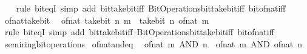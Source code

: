 \begin{isabellebody}
%
\isadelimproof
\ \ %
\endisadelimproof
%
\isatagproof
{}\isamarkupfalse%
\ {\isacharparenleft}{\kern0pt}rule\ bit{\isacharunderscore}{\kern0pt}eqI{\isacharparenright}{\kern0pt}\ {\isacharparenleft}{\kern0pt}simp\ add{\isacharcolon}{\kern0pt}\ bit{\isacharunderscore}{\kern0pt}take{\isacharunderscore}{\kern0pt}bit{\isacharunderscore}{\kern0pt}iff\ Bit{\isacharunderscore}{\kern0pt}Operations{\isachardot}{\kern0pt}bit{\isacharunderscore}{\kern0pt}take{\isacharunderscore}{\kern0pt}bit{\isacharunderscore}{\kern0pt}iff\ bit{\isacharunderscore}{\kern0pt}of{\isacharunderscore}{\kern0pt}nat{\isacharunderscore}{\kern0pt}iff{\isacharparenright}{\kern0pt}%
\endisatagproof
{\isafoldproof}%
%
\isadelimproof
\isanewline
%
\endisadelimproof
\isanewline
{}\isamarkupfalse%
\ of{\isacharunderscore}{\kern0pt}nat{\isacharunderscore}{\kern0pt}take{\isacharunderscore}{\kern0pt}bit{\isacharcolon}{\kern0pt}\isanewline
\ \ {\isacartoucheopen}of{\isacharunderscore}{\kern0pt}nat\ {\isacharparenleft}{\kern0pt}take{\isacharunderscore}{\kern0pt}bit\ n\ m{\isacharparenright}{\kern0pt}\ {\isacharequal}{\kern0pt}\ take{\isacharunderscore}{\kern0pt}bit\ n\ {\isacharparenleft}{\kern0pt}of{\isacharunderscore}{\kern0pt}nat\ m{\isacharparenright}{\kern0pt}{\isacartoucheclose}\isanewline
%
\isadelimproof
\ \ %
\endisadelimproof
%
\isatagproof
{}\isamarkupfalse%
\ {\isacharparenleft}{\kern0pt}rule\ bit{\isacharunderscore}{\kern0pt}eqI{\isacharparenright}{\kern0pt}\ {\isacharparenleft}{\kern0pt}simp\ add{\isacharcolon}{\kern0pt}\ bit{\isacharunderscore}{\kern0pt}take{\isacharunderscore}{\kern0pt}bit{\isacharunderscore}{\kern0pt}iff\ Bit{\isacharunderscore}{\kern0pt}Operations{\isachardot}{\kern0pt}bit{\isacharunderscore}{\kern0pt}take{\isacharunderscore}{\kern0pt}bit{\isacharunderscore}{\kern0pt}iff\ bit{\isacharunderscore}{\kern0pt}of{\isacharunderscore}{\kern0pt}nat{\isacharunderscore}{\kern0pt}iff{\isacharparenright}{\kern0pt}%
\endisatagproof
{\isafoldproof}%
%
\isadelimproof
\isanewline
%
\endisadelimproof
\isanewline
{}\isamarkupfalse%
\isanewline
\isanewline
{}\isamarkupfalse%
\ semiring{\isacharunderscore}{\kern0pt}bit{\isacharunderscore}{\kern0pt}operations\isanewline
{}\isanewline
\isanewline
{}\isamarkupfalse%
\ of{\isacharunderscore}{\kern0pt}nat{\isacharunderscore}{\kern0pt}and{\isacharunderscore}{\kern0pt}eq{\isacharcolon}{\kern0pt}\isanewline
\ \ {\isacartoucheopen}of{\isacharunderscore}{\kern0pt}nat\ {\isacharparenleft}{\kern0pt}m\ AND\ n{\isacharparenright}{\kern0pt}\ {\isacharequal}{\kern0pt}\ of{\isacharunderscore}{\kern0pt}nat\ m\ AND\ of{\isacharunderscore}{\kern0pt}nat\ n{\isacartoucheclose}\isanewline

\end{isabellebody}
